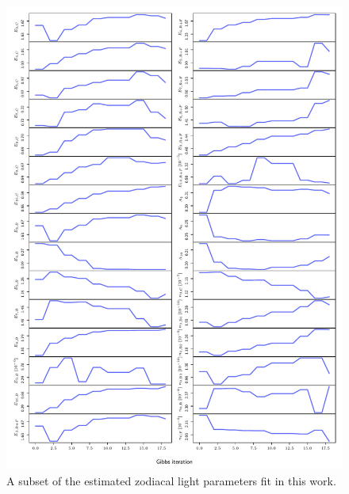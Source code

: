 \documentclass{aa}
\begin{document}
\begin{figure}
    \centering
    \includegraphics{figs/zodi_params_new.pdf}
    \caption{A subset of the estimated zodiacal light parameters fit in this work.}
    \label{fig: zodi_trace}

\end{figure}
\end{document}
